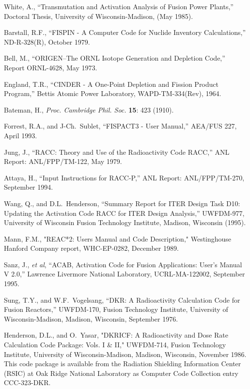 
\begin{thebibliography}{100}

 White, A., ``Transmutation and Activation
  Analysis of Fusion Power Plants,'' Doctoral Thesis, University of
  Wisconsin-Madison, (May 1985).
  
 Barstall, R.F., ``FISPIN - A Computer Code for
  Nuclide Inventory Calculations,'' ND-R-328(R), October 1979.

 Bell, M., ``ORIGEN--The ORNL Isotope Generation
  and Depletion Code,'' Report ORNL-4628, May 1973.
  
 England, T.R., ``CINDER - A One-Point Depletion and
  Fission Product Program,'' Bettis Atomic Power Laboratory,
  WAPD-TM-334(Rev), 1964.
  
 Bateman, H., \textsl{Proc. Cambridge Phil. Soc.}
  \textbf{15}: 423 (1910).
  
 Forrest, R.A., and J-Ch.~Sublet, ``FISPACT3 - User
  Manual,'' AEA/FUS 227, April 1993.
  
 Jung, J., ``RACC: Theory and Use of the Radioactivity
  Code RACC,'' ANL Report: ANL/FPP/TM-122, May 1979.
  
 Attaya, H., ``Input Instructions for RACC-P,'' ANL
  Report: ANL/FPP/TM-270, September 1994.
  
 Wang, Q., and D.L.~Henderson, ``Summary Report for
  ITER Design Task D10: Updating the Activation Code RACC for ITER
  Design Analysis,'' UWFDM-977, University of Wisconsin Fusion
  Technology Institute, Madison, Wisconsin (1995).
  
 Mann, F.M., "REAC*2: Users Manual and Code
  Description," Westinghouse Hanford Company report, WHC-EP-0282,
  December 1989.
  
 Sanz, J., \textsl{et al}, ``ACAB, Activation Code for
  Fusion Applications: User's Manual V 2.0,'' Lawrence Livermore
  National Laboratory, UCRL-MA-122002, September 1995.
  
 Sung, T.Y., and W.F.~Vogelsang, ``DKR: A Radioactivity
  Calculation Code for Fusion Reactors,'' UWFDM-170, Fusion Technology
  Institute, University of Wisconsin-Madison, Madison, Wisconsin,
  September 1976.
  
 Henderson, D.L., and O.~Yasar, "DKRICF: A
  Radioactivity and Dose Rate Calculation Code Package: Vols. I \&
  II," UWFDM-714, Fusion Technology Institute, University of
  Wisconsin-Madison, Madison, Wisconsin, November 1986.  This code
  package is available from the Radiation Shielding Information Center
  (RSIC) at Oak Ridge National Laboratory as Computer Code Collection
  entry CCC-323-DKR.
  

\end{thebibliography}
